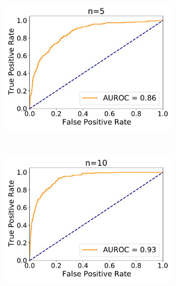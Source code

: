 \begin{figure}[H]
\begin{subfigure}{.33\textwidth}
		\includegraphics[width=1\linewidth]{figures/roc_analysis/roc_particleFilter/AUROC_2000samples_class0_llh_n5}
		\caption{}
		\label{fig:roc_part_n5}
	\end{subfigure}\\
	\begin{subfigure}{.33\textwidth}
		\centering
		\includegraphics[width=1\linewidth]{figures/roc_analysis/roc_particleFilter/AUROC_2000samples_class0_llh_n10}
		\caption{}
		\label{fig:roc_part_n10}
	\end{subfigure}%
	\begin{subfigure}{.33\textwidth}
		\centering

\end{subfigure}
\end{figure}
